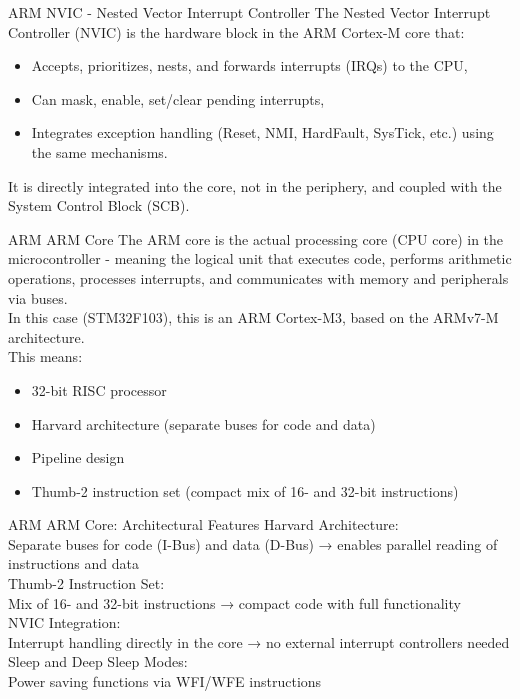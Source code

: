 \documentclass{beamer}
\begin{document}
\begin{frame}{ARM}
	{NVIC - Nested Vector Interrupt Controller}
	The Nested Vector Interrupt Controller (NVIC) is the hardware block in the ARM Cortex-M core that:
	\begin{itemize}
		\item Accepts, prioritizes, nests, and forwards interrupts (IRQs) to the CPU,
		\item Can mask, enable, set/clear pending interrupts,
		\item Integrates exception handling (Reset, NMI, HardFault, SysTick, etc.) using the same mechanisms.
	\end{itemize}
	It is directly integrated into the core, not in the periphery, and coupled with the System Control Block (SCB).
\end{frame}
\begin{frame}{ARM}
	{ARM Core}
	The ARM core is the actual processing core (CPU core) in the microcontroller - meaning the logical unit that executes code, performs arithmetic operations, processes interrupts, and communicates with memory and peripherals via buses.\\
	\vspace{0.2cm}
	In this case (STM32F103), this is an ARM Cortex-M3, based on the ARMv7-M architecture.\\
	This means:
	\begin{itemize}
		\item 32-bit RISC processor
		\item Harvard architecture (separate buses for code and data)
		\item Pipeline design
		\item Thumb-2 instruction set (compact mix of 16- and 32-bit instructions)
	\end{itemize}
\end{frame}
\begin{frame}{ARM}
	{ARM Core: Architectural Features}
	Harvard Architecture:\\
	Separate buses for code (I-Bus) and data (D-Bus) → enables parallel reading of instructions and data\\
	\vspace{0.2cm}
	Thumb-2 Instruction Set:\\
	Mix of 16- and 32-bit instructions → compact code with full functionality\\
	\vspace{0.2cm}
	NVIC Integration:\\
	Interrupt handling directly in the core → no external interrupt controllers needed\\
	\vspace{0.2cm}
	Sleep and Deep Sleep Modes:\\
	Power saving functions via WFI/WFE instructions
\end{frame}
\end{document}

